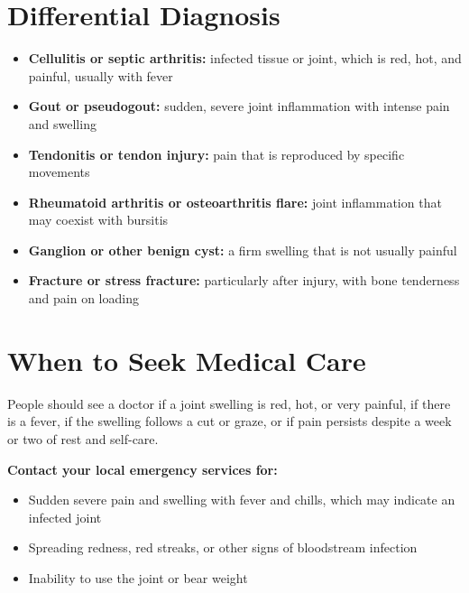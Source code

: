 \section*{Differential Diagnosis}
\begin{itemize}
    \item \textbf{Cellulitis or septic arthritis:} infected tissue or joint, which is red, hot, and painful, usually with fever
    \item \textbf{Gout or pseudogout:} sudden, severe joint inflammation with intense pain and swelling
    \item \textbf{Tendonitis or tendon injury:} pain that is reproduced by specific movements
    \item \textbf{Rheumatoid arthritis or osteoarthritis flare:} joint inflammation that may coexist with bursitis
    \item \textbf{Ganglion or other benign cyst:} a firm swelling that is not usually painful
    \item \textbf{Fracture or stress fracture:} particularly after injury, with bone tenderness and pain on loading
\end{itemize}

\section*{When to Seek Medical Care}
People should see a doctor if a joint swelling is red, hot, or very painful, if there is a fever, if the swelling follows a cut or graze, or if pain persists despite a week or two of rest and self-care.

\textbf{Contact your local emergency services for:}
\begin{itemize}
    \item Sudden severe pain and swelling with fever and chills, which may indicate an infected joint
    \item Spreading redness, red streaks, or other signs of bloodstream infection
    \item Inability to use the joint or bear weight
\end{itemize}

